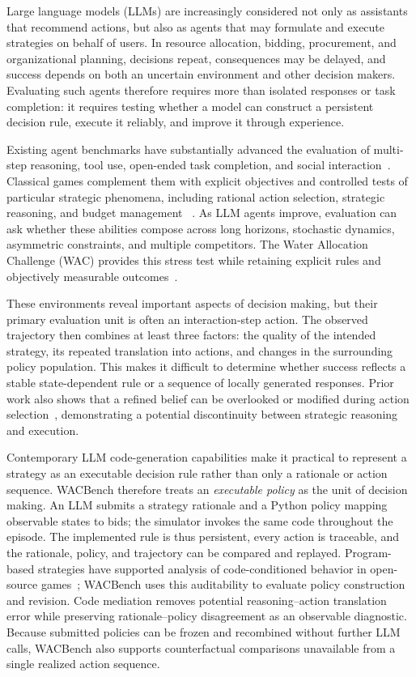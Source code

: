 \documentclass[letterpaper]{article} %
\begin{document}
Large language models (LLMs) are increasingly considered not only as
assistants that recommend actions, but also as agents that may formulate and
execute strategies on behalf of users. In resource allocation, bidding,
procurement, and organizational planning, decisions repeat, consequences may
be delayed, and success depends on both an uncertain environment and other
decision makers. Evaluating such agents therefore requires more than isolated
responses or task completion: it requires testing whether a model can
construct a persistent decision rule, execute it reliably, and improve it
through experience.

Existing agent benchmarks have substantially advanced the evaluation of
multi-step reasoning, tool use, open-ended task completion, and social
interaction~\cite{liu2023agentbench,mialon2023gaia,zhou2024sotopia,zhu2025multiagentbench}.
Classical games complement them with explicit objectives and controlled tests
of particular strategic phenomena, including rational action selection,
strategic reasoning, and budget management
~\cite{fan2024rational,duan2024gtbench,huang2025gamabench,chen2023aucarena}.
As LLM agents improve, evaluation can ask whether these abilities compose
across long horizons, stochastic dynamics, asymmetric constraints, and
multiple competitors. The Water
Allocation Challenge (WAC) provides this stress test while retaining explicit
rules and objectively measurable outcomes~\cite{mao2025alympics}.

These environments reveal important aspects of decision making, but their
primary evaluation unit is often an interaction-step action. The observed
trajectory then combines at least three factors: the quality of the intended
strategy, its repeated translation into actions, and changes in the
surrounding policy population. This makes it difficult to determine whether
success reflects a stable state-dependent rule or a sequence of locally
generated responses. Prior work also shows that a refined belief can be
overlooked or modified during action selection~\cite{fan2024rational},
demonstrating a potential discontinuity between strategic reasoning and
execution.

Contemporary LLM code-generation capabilities make it practical to represent
a strategy as an executable decision rule rather than only a rationale or
action sequence. WACBench therefore treats an \emph{executable policy} as the
unit of decision making. An LLM submits a strategy rationale and a Python
policy mapping observable states to bids; the simulator invokes the same code
throughout the episode. The implemented rule is thus persistent, every action
is traceable, and the rationale, policy, and trajectory can be compared and
replayed. Program-based strategies have supported analysis of code-conditioned
behavior in open-source games~\cite{sistla2025opensourcegames}; WACBench uses
this auditability to evaluate policy construction and revision.
Code mediation removes potential reasoning--action translation error while
preserving rationale--policy disagreement as an observable diagnostic.
Because submitted policies can be frozen and recombined without further LLM
calls, WACBench also supports counterfactual comparisons unavailable from a
single realized action sequence.
\end{document}
